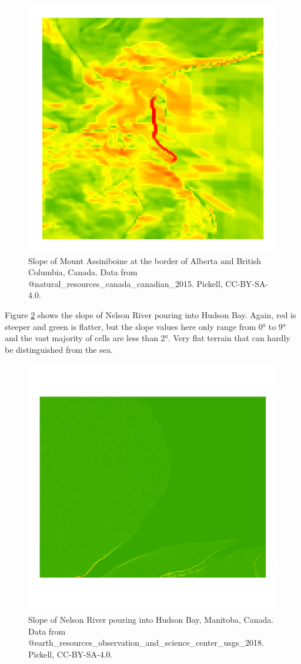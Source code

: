 \documentclass[
]{book}
\begin{document}
\begin{figure}
\includegraphics[width=0.75\linewidth]{images/09-mount-assiniboine-slope} \caption{Slope of Mount Assiniboine at the border of Alberta and British Columbia, Canada. Data from @natural_resources_canada_canadian_2015. Pickell, CC-BY-SA-4.0.}\label{fig:9-mount-assiniboine-slope}
\end{figure}

Figure \ref{fig:9-nelson-river-slope} shows the slope of Nelson River pouring into Hudson Bay. Again, red is steeper and green is flatter, but the slope values here only range from 0° to 9° and the vast majority of cells are less than 2°. Very flat terrain that can hardly be distinguished from the sea.

\begin{figure}
\includegraphics[width=0.75\linewidth]{images/09-nelson-river-slope} \caption{Slope of Nelson River pouring into Hudson Bay, Manitoba, Canada. Data from @earth_resources_observation_and_science_center_usgs_2018. Pickell, CC-BY-SA-4.0.}\label{fig:9-nelson-river-slope}
\end{figure}
\end{document}
